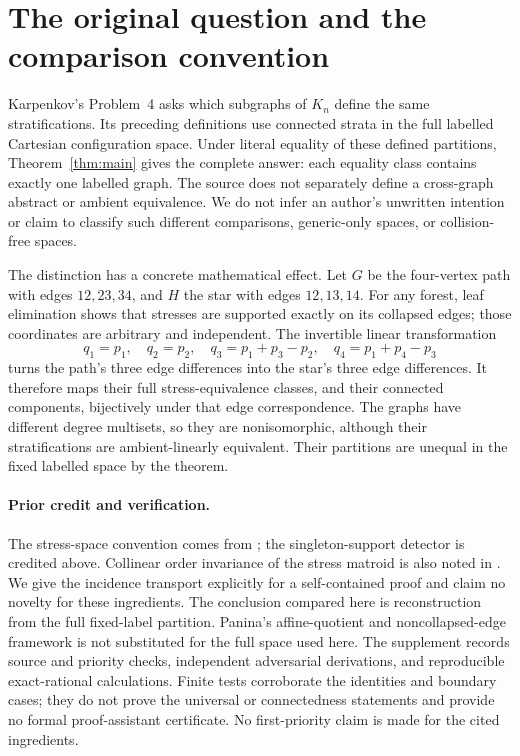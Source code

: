 \documentclass[11pt]{article}
\begin{document}
\section{The original question and the comparison convention}
Karpenkov's Problem~4 \cite[p.~22]{Karpenkov} asks which subgraphs of $K_n$
define the same stratifications. Its preceding definitions use connected
strata in the full labelled Cartesian configuration space. Under literal
equality of these defined partitions, Theorem~\ref{thm:main} gives the complete
answer: each equality class contains exactly one labelled graph. The source
does not separately define a cross-graph abstract or ambient equivalence.
We do not infer an author's unwritten intention or claim to classify such
different comparisons, generic-only spaces, or collision-free spaces.

The distinction has a concrete mathematical effect. Let $G$ be the
four-vertex path with edges $12,23,34$, and $H$ the star with edges $12,13,14$.
For any forest, leaf elimination shows that stresses are supported exactly on
its collapsed edges; those coordinates are arbitrary and independent.
The invertible linear transformation
\[
 q_1=p_1,\quad q_2=p_2,\quad
 q_3=p_1+p_3-p_2,\quad q_4=p_1+p_4-p_3
\]
turns the path's three edge differences into the star's three edge differences.
It therefore maps their full stress-equivalence classes, and their connected
components, bijectively under that edge correspondence. The graphs have
different degree multisets, so they are nonisomorphic, although their
stratifications are ambient-linearly equivalent. Their partitions are unequal
in the fixed labelled space by the theorem.

\paragraph{Prior credit and verification.}
The stress-space convention comes from \cite{DKS,Karpenkov}; the
singleton-support detector is credited above. Collinear order invariance of
the stress matroid is also noted in \cite[Appendix~A.3; preprint v4, Section~4.1]{Panina}.
We give the incidence transport explicitly for a self-contained proof and
claim no novelty for these ingredients. The conclusion compared here is
reconstruction from the full fixed-label partition. Panina's affine-quotient and
noncollapsed-edge framework is not substituted for the full space used here.
The supplement records source and priority checks, independent adversarial
derivations, and reproducible exact-rational calculations. Finite tests
corroborate the identities and boundary cases; they do not prove the universal
or connectedness statements and provide no formal proof-assistant certificate.
No first-priority claim is made for the cited ingredients.
\end{document}
